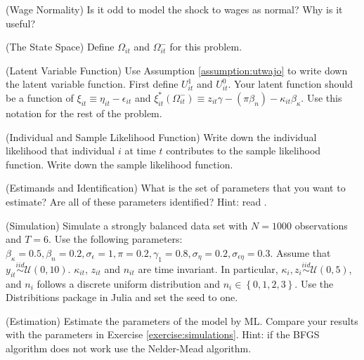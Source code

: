 \begin{exercise} (Wage Normality)
Is it odd to model the shock to wages as normal? Why is it useful? 
\end{exercise}

\begin{exercise} (The State Space)
Define $\Omega_{it}$ and $\Omega_{it}^-$ for this problem. 
\end{exercise}

\begin{exercise} (Latent Variable Function)
Use Assumption \ref{assumption:utwajo} to write down the latent variable function. First define $U_{it}^1$ and $U_{it}^0$. Your latent function should be a function of $\xi_{it} \equiv \eta_{it} - \epsilon_{it}$ and  $\xi_{it}^*\left( \Omega_{it}^- \right) \equiv z_{it} \gamma - \left( \pi \beta_{n} \right) - \kappa_{it} \beta_{\kappa}$. Use this notation for the rest of the problem.
\end{exercise}

\begin{exercise} (Individual and Sample Likelihood Function) \label{exercise:likelihood}
Write down the individual likelihood that individual $i$ at time $t$ contributes to the sample likelihood function. Write down the sample likelihood function.
\end{exercise}

\begin{exercise} (Estimands and Identification) \label{exercise:estimands}
What is the set of parameters that you want to estimate? Are all of these parameters identified? Hint: read \citet{heckman1979sample}.
\end{exercise}

\begin{exercise} (Simulation) \label{exercise:simulations}
Simulate a strongly balanced data set with $N = 1000$ observations and $T=6$. Use the following parameters: $\beta_\kappa = 0.5, \beta_n = 0.2, \sigma_\epsilon = 1, \pi = 0.2, \gamma_1 = 0.8, \sigma_\eta = 0.2, \sigma_{\epsilon \eta} = 0.3$. Assume that $y_{it} \overset{iid}{\sim} \mathcal{U} (0,10)$. $\kappa_{it}$, $z_{it}$ and $n_{it}$ are time invariant. In particular, $\kappa_{i}, z_{i} \overset{iid}{\sim} \mathcal{U} (0,5)$, and $n_{i}$ follows a discrete uniform distribution and $n_{i} \in \left\{0,1,2,3\right\}$. Use the Distribitions package in Julia and set the seed to one.
\end{exercise}

\begin{exercise} (Estimation)
Estimate the parameters of the model by ML. Compare your results with the parameters in Exercise \ref{exercise:simulations}. Hint: if the BFGS algorithm does not work use the Nelder-Mead algorithm.
\end{exercise}

